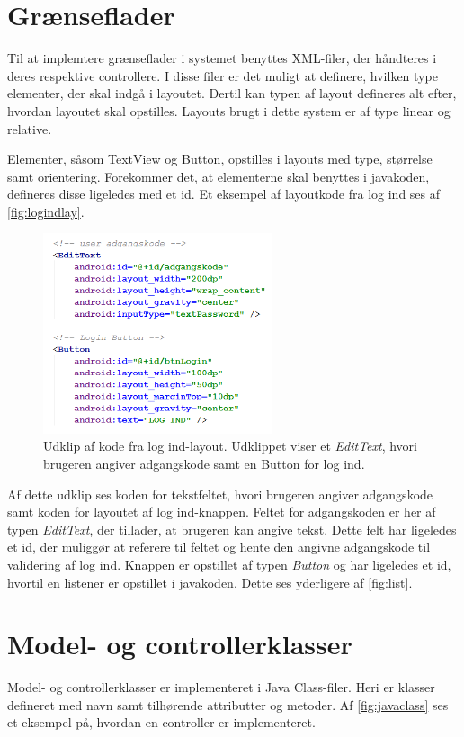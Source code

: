 \section{Grænseflader}
Til at implemtere grænseflader i systemet benyttes XML-filer, der håndteres i deres respektive controllere. I disse filer er det muligt at definere, hvilken type elementer, der skal indgå i layoutet. Dertil kan typen af layout defineres alt efter, hvordan layoutet skal opstilles. Layouts brugt i dette system er af type linear og relative.  

Elementer, såsom TextView og Button, opstilles i layouts med type, størrelse samt orientering. Forekommer det, at elementerne skal benyttes i javakoden, defineres disse ligeledes med et id. Et eksempel af layoutkode fra log ind ses af \autoref{fig:logindlay}.

\begin{figure} [H]
\centering
\includegraphics[width=0.6\textwidth]{figures/imple/logindlay}
\caption{Udklip af kode fra log ind-layout. Udklippet viser et \textit{EditText}, hvori brugeren angiver adgangskode samt en Button for log ind.}
\label{fig:logindlay}
\end{figure}

\noindent
Af dette udklip ses koden for tekstfeltet, hvori brugeren angiver adgangskode samt koden for layoutet af log ind-knappen. Feltet for adgangskoden er her af typen \textit{EditText}, der tillader, at brugeren kan angive tekst. Dette felt har ligeledes et id, der muliggør at referere til feltet og hente den angivne adgangskode til validering af log ind. Knappen er opstillet af typen \textit{Button} og har ligeledes et id, hvortil en listener er opstillet i javakoden. Dette ses yderligere af \autoref{fig:list}.

\section{Model- og controllerklasser} \label{sec:impmodelcon}
Model- og controllerklasser er implementeret i Java Class-filer. Heri er klasser defineret med navn samt tilhørende attributter og metoder. Af \autoref{fig:javaclass} ses et eksempel på, hvordan en controller er implementeret. 

